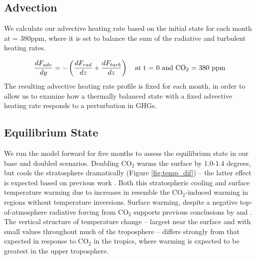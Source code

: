 \documentclass[draft]{agujournal2019}
\begin{document}
\subsection{Advection}
We calculate our advective heating rate based on the initial state for each month at  = 380ppm, where it is set to balance the sum of the radiative and turbulent heating rates.

\begin{equation}
    \frac{dF_{adv}}{dy} = -\left( \frac{dF_{rad}}{dz} + \frac{dF_{turb}}{dz} \right)\quad \text{at t = 0 and \ce{CO_2} = 380 ppm}
\end{equation}
The resulting advective heating rate profile is fixed for each month, in order to allow us to examine how a thermally balanced state with a fixed advective heating rate responds to a perturbation in GHGs. 
\subsection{Equilibrium State}
We run the model forward for five months to assess the equilibrium state in our base and doubled  scenarios. Doubling CO$_2$ warms the surface by 1.0-1.4 degrees, but cools the stratosphere dramatically (Figure \ref{fig:temp_dif})  -- the latter effect is expected based on previous work \cite{langematz_thermal_2003}. Both this stratospheric cooling and surface temperature warming due to increases in  resemble the CO$_2$-induced warming in regions without temperature inversions. Surface warming, despite a negative top-of-atmosphere radiative forcing from CO$_2$ supports previous conclusions by  and . The vertical structure of temperature change -- largest near the surface and with small values throughout much of the troposphere -- differs strongly from that expected in response to CO$_2$ in the tropics, where warming is expected to be greatest in the upper troposphere.
\end{document}
